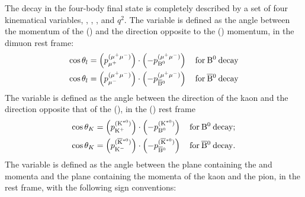 
The decay in the four-body final state is completely described by a set of four kinematical variables, \TL, \TK, \PHI, and $q^2$.
The variable \TL is defined as the angle between the momentum of the \Pgmp (\Pgmm) and the direction opposite to the \PBz (\PaBz) momentum, in the dimuon rest frame:
\begin{equation} \label{eq:TLdef}
  \begin{aligned}
    \cos\theta_l & = \left( p_{\mu^{+}}^{(\mu^{+}\mu^{-})} \right) \cdot \left( -p_{{\textrm{B}}{}^{0} }^{(\mu^{+}\mu^{-})} \right)\, && \mathrm{for}\:{\textrm{B}}{}^{0}\:\mathrm{decay} \\
    \cos\theta_l & = \left( p_{\mu^{-}}^{(\mu^{+}\mu^{-})} \right) \cdot \left( -p_{\overline{\textrm{B}}{}^{0}}^{(\mu^{+}\mu^{-})} \right)\, && \mathrm{for}\:\overline{\textrm{B}}{}^{0}\:\mathrm{decay} \\
  \end{aligned}
\end{equation}
The variable \TK is defined as the angle between the direction of the kaon and the direction opposite that of the \PBz (\PaBz), in the \cPKstz (\cPAKstz) rest frame
\begin{equation} \label{eq:TKdef}
  \begin{aligned}
    \cos\theta_K&=\left( p_{\textrm{K}^{+}}^{(\textrm{K}^{\ast0}) } \right) \cdot \left( -p_{{\textrm{B}}{}^{0} }^{(\textrm{K}^{\ast0}) } \right)\, && \mathrm{for}\:{\textrm{B}}{}^{0}\:\mathrm{decay;} \\
    \cos\theta_K&=\left( p_{\textrm{K}^{-}}^{(\overline{\textrm{K}}{}^{\ast0})} \right) \cdot \left( -p_{\overline{\textrm{B}}{}^{0}}^{(\overline{\textrm{K}}{}^{\ast0})} \right)\, && \mathrm{for}\:\overline{\textrm{B}}{}^{0}\:\mathrm{decay.}
  \end{aligned}
\end{equation}
The variable \PHI is defined as the angle between the plane containing the \Pgmp and \Pgmm momenta and the plane containing the momenta of the kaon and the pion, in the \PBz rest frame, with the following sign conventions:
